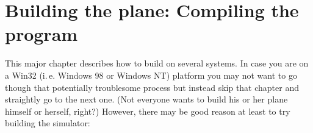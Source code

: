 
\chapter{Building the plane: Compiling the program\label{building}}

This major chapter describes how to build \FlightGear on several systems. In case you are
on a Win32 (i.\,e. Windows 98 or Windows NT) platform you may not want to go though that
potentially troublesome process but instead skip that chapter and straightly go to the
next one. (Not everyone wants to build his or her plane himself or herself, right?)
However, there may be good reason at least to try building the simulator:

